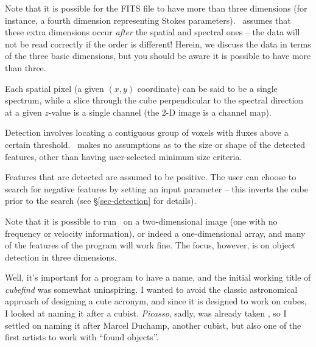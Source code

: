Note that it is possible for the FITS file to have more than three
dimensions (for instance, a fourth dimension representing Stokes
parameters). \duchamp\ assumes that these extra dimensions occur
\emph{after} the spatial and spectral ones -- the data will not be
read correctly if the order is different! Herein, we discuss the data
in terms of the three basic dimensions, but you should be aware it is
possible to have more than three.

Each spatial pixel (a given $(x,y)$ coordinate) can be said to be a
single spectrum, while a slice through the cube perpendicular to the
spectral direction at a given $z$-value is a single channel (the 2-D
image is a channel map).

Detection involves locating a contiguous group of voxels with fluxes
above a certain threshold. \duchamp\ makes no assumptions as to the
size or shape of the detected features, other than having
user-selected minimum size criteria.

Features that are detected are assumed to be positive. The user can
choose to search for negative features by setting an input parameter
-- this inverts the cube prior to the search (see
\S\ref{sec-detection} for details).

Note that it is possible to run \duchamp\ on a two-dimensional image
(\ie one with no frequency or velocity information), or indeed a
one-dimensional array, and many of the features of the program will
work fine. The focus, however, is on object detection in three
dimensions.


Well, it's important for a program to have a name, and the initial
working title of \emph{cubefind} was somewhat uninspiring. I wanted to
avoid the classic astronomical approach of designing a cute acronym,
and since it is designed to work on cubes, I looked at naming it after
a cubist. \emph{Picasso}, sadly, was already taken \citep{minchin99},
so I settled on naming it after Marcel Duchamp, another cubist, but
also one of the first artists to work with ``found objects''.

